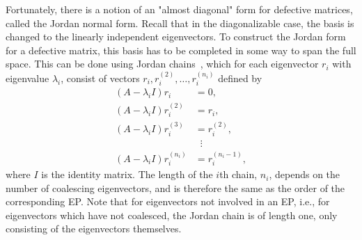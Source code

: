 \documentclass[../main.tex]{subfiles}
\begin{document}
Fortunately, there is a notion of an "almost diagonal" form for defective matrices, called the Jordan normal form. Recall that in the diagonalizable case, the basis is changed to the linearly independent eigenvectors. To construct the Jordan form for a defective matrix, this basis has to be completed in some way to span the full space. This can be done using Jordan chains~\cite{uffe}, which for each eigenvector $r_i$ with eigenvalue $\lambda_i$, consist of vectors $r_i, r_i^{(2)}, \dots,   r_i^{(n_i)}$ defined by
\begin{equation}\label{jordanchain}
\begin{aligned}
    (A-\lambda_iI)r_i &= 0, \\
    (A-\lambda_iI)r_i^{(2)} &= r_i, \\
    (A-\lambda_iI)r_i^{(3)} &= r_i^{(2)}, \\
    &\;\;\vdots \\
    (A-\lambda_iI)r_i^{(n_i)} &= r_i^{(n_i-1)},
\end{aligned}
\end{equation}
where $I$ is the identity matrix. The length of the $i$th chain, $n_i$, depends on the number of coalescing eigenvectors, and is therefore the same as the order of the corresponding EP. Note that for eigenvectors not involved in an EP, i.e., for eigenvectors which have not coalesced, the Jordan chain is of length one, only consisting of the eigenvectors themselves.
\end{document}
